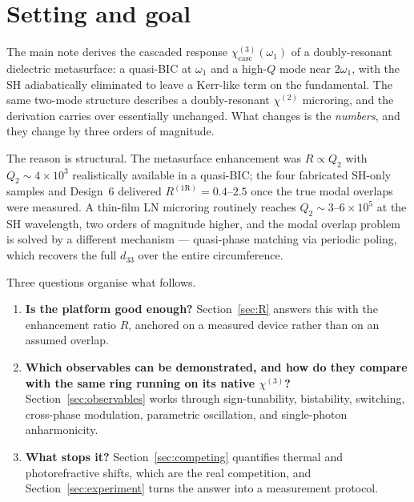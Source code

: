 \documentclass[11pt,a4paper]{article}
\newcommand{\chitwo}{\chi^{(2)}}
\newcommand{\chithree}{\chi^{(3)}}
\begin{document}
\tableofcontents

\section{Setting and goal}\label{sec:setting}

The main note derives the cascaded response
$\chithree_{\text{casc}}(\omega_1)$ of a doubly-resonant dielectric
metasurface: a quasi-BIC at $\omega_1$ and a high-$Q$ mode near
$2\omega_1$, with the SH adiabatically eliminated to leave a Kerr-like
term on the fundamental.  The same two-mode structure describes a
doubly-resonant $\chitwo$ microring, and the derivation carries over
essentially unchanged.  What changes is the \emph{numbers}, and they
change by three orders of magnitude.

The reason is structural.  The metasurface enhancement was
$R\propto Q_2$ with $Q_2\sim4\times10^3$ realistically available in a
quasi-BIC; the four fabricated SH-only samples and Design~6 delivered
$R^{(1\mathrm R)}=0.4$--$2.5$ once the true modal overlaps were measured.
A thin-film LN microring routinely reaches $Q_2\sim3$--$6\times10^5$ at
the SH wavelength, two orders of magnitude higher, and the modal overlap
problem is solved by a different mechanism --- quasi-phase matching via
periodic poling, which recovers the full $d_{33}$ over the entire
circumference.

Three questions organise what follows.

\begin{enumerate}[label=(\roman*),leftmargin=2em]
\item \textbf{Is the platform good enough?}  Section~\ref{sec:R}
  answers this with the enhancement ratio $R$, anchored on a measured
  device rather than on an assumed overlap.
\item \textbf{Which observables can be demonstrated, and how do they
  compare with the same ring running on its native $\chithree$?}
  Section~\ref{sec:observables} works through sign-tunability,
  bistability, switching, cross-phase modulation, parametric
  oscillation, and single-photon anharmonicity.
\item \textbf{What stops it?}  Section~\ref{sec:competing} quantifies
  thermal and photorefractive shifts, which are the real competition,
  and Section~\ref{sec:experiment} turns the answer into a measurement
  protocol.
\end{enumerate}
\end{document}
